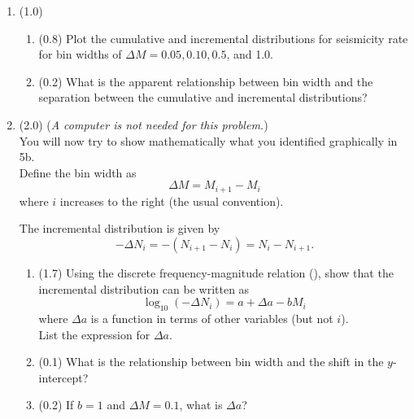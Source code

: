 \documentclass[11pt,titlepage,fleqn]{article}
\begin{document}
\begin{enumerate}

\item (1.0)
%
\begin{enumerate}
\item (0.8) Plot the cumulative and incremental distributions for seismicity rate for bin widths of $\Delta M = 0.05, 0.10, 0.5$, and 1.0.
\item (0.2) What is the apparent relationship between bin width and the separation between the cumulative and incremental distributions?
\end{enumerate}


\pagebreak
\item (2.0) ({\em A computer is not needed for this problem.}) \\
You will now try to show mathematically what you identified graphically in 5b. \\
Define the bin width as
%
\begin{equation}
\Delta M = M_{i+1} - M_i
\label{dM}
\end{equation}
%
where $i$ increases to the right (the usual convention).

The incremental distribution is given by
%
\begin{equation}
-\Delta N_i = -(N_{i+1} - N_i) = N_i - N_{i+1}.
\end{equation}
%
\begin{enumerate}
\item (1.7) Using the discrete frequency-magnitude relation (), show that the incremental distribution can be written as
%
\begin{equation}
\log_{10}(-\Delta N_i) = a + \Delta a - b M_i
\label{inc}
\end{equation}
%
where $\Delta a$ is a function in terms of other variables (but not $i$). \\
List the expression for $\Delta a$.


\item (0.1) What is the relationship between bin width and the shift in the $y$-intercept?

\item (0.2) If $b = 1$ and $\Delta M = 0.1$, what is $\Delta a$?
\end{enumerate}



\end{enumerate}
\end{document}

